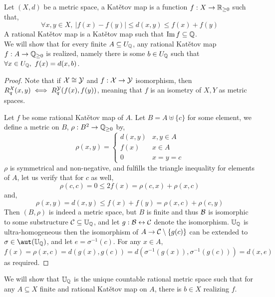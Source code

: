 \subquestion{}
Let $(X, d)$ be a metric space, a Katětov map is a function $f : X \to \mathbb{R}_{\ge 0}$ such that,
\[
	\forall x, y \in X,\ 
	|f(x) - f(y)| \le d(x, y) \le f(x) + f(y)
\]
A rational Katětov map is a Katětov map such that $\operatorname{Im} f \subseteq \mathbb{Q}$. \\
We will show that for every finite $A \subseteq U_{\mathbb{Q}}$, any rational Katětov map $f : A \to \mathbb{Q}_{\ge 0}$ is realized, namely there is some $b \in U_{\mathbb{Q}}$ such that $\forall x \in U_{\mathbb{Q}},\ f(x) = d(x, b)$.
\begin{proof}
	Note that if $\mathcal{X} \cong \mathcal{Y}$ and $f : \mathcal{X} \to \mathcal{Y}$ isomorphism, then $R_q^{\mathcal{X}}(x, y) \iff R_q^{\mathcal{Y}}(f(x), f(y))$, meaning that $f$ is an isometry of $X, Y$ as metric spaces.

	Let $f$ be some rational Katětov map of $A$.
	Let $B = A \uplus \{ c \}$ for some element, we define a metric on $B$, $\rho : B^2 \to \mathbb{Q}_{\ge 0}$ by,
	\[
		\rho(x, y)
		= \begin{cases}
			d(x, y) & x, y \in A \\
			f(x) & x \in A \\
			0 & x = y = c
		\end{cases}
	\]
	$\rho$ is symmetrical and non-negative, and fulfills the triangle inequality for elements of $A$, let us verify that for $c$ as well,
	\[
		\rho(c, c)
		= 0
		\le 2 f(x)
		= \rho(c, x) + \rho(x, c)
	\]
	and,
	\[
		\rho(x, y)
		= d(x, y)
		\le f(x) + f(y)
		= \rho(x, c) + \rho(c, y)
	\]
	Then $(B, \rho)$ is indeed a metric space, but $B$ is finite and thus $\mathcal{B}$ is isomorphic to some substructure $\mathcal{C} \subseteq \mathbb{U}_{\mathbb{Q}}$, and let $g : \mathcal{B} \leftrightarrow \mathcal{C}$ denote the isomorphism.
	$\mathbb{U}_{\mathbb{Q}}$ is ultra-homogeneous then the isomorphism of $A \to \mathcal{C} \setminus \{ g(c) \}$ can be extended to $\sigma \in \aut(\UU_\QQ)$, and let $e = \sigma^{-1}(c)$.
	For any $x \in A$, $f(x) = \rho(x, c) = d(g(x), g(c)) = d(\sigma^{-1}(g(x)), \sigma^{-1}(g(c))) = d(x, e)$ as required.
\end{proof}
We will show that $\mathbb{U}_{\mathbb{Q}}$ is the unique countable rational metric space such that for any $A \subseteq X$ finite and rational Katětov map on $A$, there is $b \in X$ realizing $f$.
